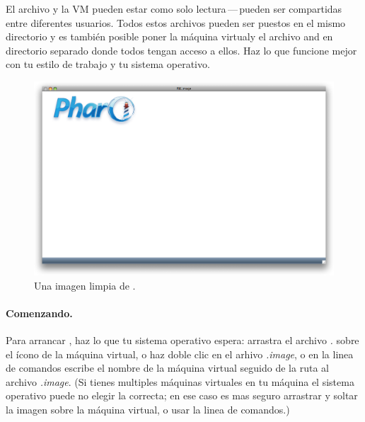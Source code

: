 \documentclass[a4paper,10pt,twoside]{book}
\begin{document}
El archivo  y la VM pueden estar como solo lectura\,---\,pueden ser compartidas entre diferentes usuarios.
Todos estos archivos pueden ser puestos en el mismo directorio y es tambi\'en posible poner la m\'aquina virtualy el archivo and  en directorio separado donde todos tengan acceso a ellos.
Haz lo que funcione mejor con tu estilo de trabajo y tu sistema operativo.


\begin{figure}[htb]
\centerline {\includegraphics[width=\textwidth]{startup}}
\caption{Una imagen limpia de \pbe.}
\end{figure}

\paragraph{Comenzando.} Para arrancar \pharo, haz lo que tu sistema operativo espera: arrastra el archivo \emph{.} sobre el \'icono de la m\'aquina virtual, o haz doble clic en el arhivo \emph{.image}, o en la linea de comandos escribe el nombre de la m\'aquina virtual seguido de la ruta al archivo \emph{.image}. (Si tienes multiples m\'aquinas virtuales en tu m\'aquina el sistema operativo puede no elegir la correcta; en ese caso es mas seguro arrastrar y soltar la imagen sobre la m\'aquina virtual, o usar la linea de comandos.)
\end{document}
